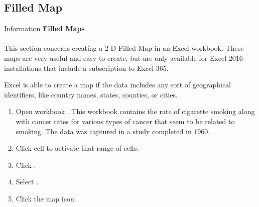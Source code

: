 


\subsection{Filled Map}

\begin{center}
	\begin{infobox}{Information}
		\textbf{Filled Maps}
		\\
		\\
		This section concerns creating a 2-D Filled Map in an Excel workbook. These maps are very useful and easy to create, but are only available for Excel $ 2016 $ installations that include a subscription to Excel $ 365 $.
	\end{infobox}
\end{center}


Excel is able to create a map if the data includes any sort of geographical identifiers, like country names, states, counties, or cities. 

\begin{enumerate}
	\item Open workbook . This workbook contains the rate of cigarette smoking along with cancer rates for various types of cancer that seem to be related to smoking. The data was captured in a study completed in $ 1960 $.
	\item Click cell  to activate that range of cells.
	\item Click .
	\item Select .
	\item Click the map icon.
\end{enumerate}

